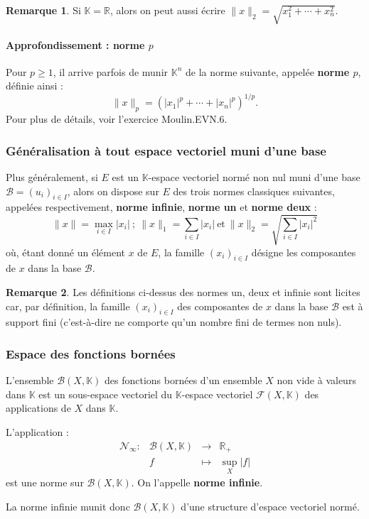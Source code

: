 \documentclass[french]{article}
\newcommand{\R}{\mathbb{R}}
\newcommand{\K}{\mathbb{K}}
\theoremstyle{plain}
\theoremstyle{definition}
\newtheorem*{rmq}{Remarque}
\theoremstyle{remark}
\begin{document}
\begin{rmq}
	Si $\K=\R$, alors on peut aussi écrire $\lVert x\rVert_2=\sqrt{x_1^2+\cdots+x_n^2}$.
\end{rmq}

\paragraph{Approfondissement : norme $p$} Pour $p\geqslant 1$, il arrive parfois de munir $\K^n$ de la norme suivante, appelée \textbf{norme $p$}, définie ainsi : $$\lVert x\rVert_p=(\lvert x_1\rvert^p+\cdots+\lvert x_n\rvert^p)^{1/p}.$$ Pour plus de détails, voir l'exercice Moulin.EVN.6.

\subsubsection*{Généralisation à tout espace vectoriel muni d'une base}
Plus généralement, si $E$ est un $\K$-espace vectoriel normé non nul muni d'une base $\mathcal{B}=(u_i)_{i\in I}$, alors on dispose sur $E$ des trois normes classiques suivantes, appelées respectivement, \textbf{norme infinie}, \textbf{norme un} et \textbf{norme deux} : $$\lVert x\rVert=\underset{i\in I}{\max}\lvert x_i\rvert\ ; \ \lVert x\rVert_1=\sum_{i\in I}\lvert x_i\rvert\ \text{et}\ \lVert x\rVert_2=\sqrt{\sum_{i\in I}\lvert x_i\rvert^2}$$ où, étant donné un élément $x$ de $E$, la famille $(x_i)_{i\in I}$ désigne les composantes de $x$ dans la base $\mathcal{B}$.

\begin{rmq}
	Les définitions ci-dessus des normes un, deux et infinie sont licites car, par définition, la famille $(x_i)_{i\in I}$ des composantes de $x$ dans la base $\mathcal{B}$ est à support fini (c'est-à-dire ne comporte qu'un nombre fini de termes non nuls).
\end{rmq}

\subsubsection*{Espace des fonctions bornées}
L'ensemble $\mathcal{B}(X,\K)$ des fonctions bornées d'un ensemble $X$ non vide à valeurs dans $\K$ est un sous-espace vectoriel du $\K$-espace vectoriel $\mathcal{F}(X,\K)$ des applications de $X$ dans $\K$.

\begin{prop}
	L'application : $$\begin{array}{lrcl}
		\mathcal{N}_\infty:&\mathcal{B}(X,\K)&\longrightarrow&\R_+\\
		&f&\longmapsto&\underset{X}{\sup}\lvert f\rvert
	\end{array}$$ est une norme sur $\mathcal{B}(X,\K)$. On l'appelle \textbf{norme infinie}.
\end{prop}
La norme infinie munit donc $\mathcal{B}(X,\K)$ d'une structure d'espace vectoriel normé.
\end{document}

